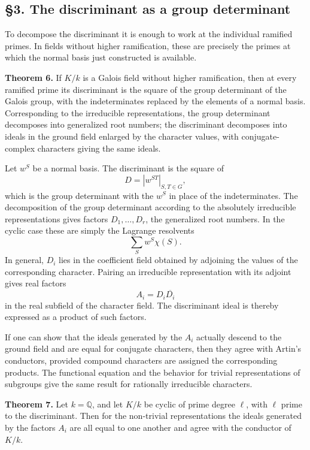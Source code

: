 \documentclass[11pt]{article}
\begin{document}
\subsection{§3. The discriminant as a group
determinant}\label{the-discriminant-as-a-group-determinant}

To decompose the discriminant it is enough to work at the individual
ramified primes. In fields without higher ramification, these are
precisely the primes at which the normal basis just constructed is
available.

\textbf{Theorem 6.} If \(K/k\) is a Galois field without higher
ramification, then at every ramified prime its discriminant is the
square of the group determinant of the Galois group, with the
indeterminates replaced by the elements of a normal basis. Corresponding
to the irreducible representations, the group determinant decomposes
into generalized root numbers; the discriminant decomposes into ideals
in the ground field enlarged by the character values, with
conjugate-complex characters giving the same ideals.

Let \(w^S\) be a normal basis. The discriminant is the square of \[
  D=|w^{ST}|_{S,T\in G},
\] which is the group determinant with the \(w^S\) in place of the
indeterminates. The decomposition of the group determinant according to
the absolutely irreducible representations gives factors \(D_1,
\ldots,D_r\), the generalized root numbers. In the cyclic case these are
simply the Lagrange resolvents \[
  \sum_S w^S \chi(S).
\] In general, \(D_i\) lies in the coefficient field obtained by
adjoining the values of the corresponding character. Pairing an
irreducible representation with its adjoint gives real factors \[
  A_i=D_i\overline{D_i}
\] in the real subfield of the character field. The discriminant ideal
is thereby expressed as a product of such factors.

If one can show that the ideals generated by the \(A_i\) actually
descend to the ground field and are equal for conjugate characters, then
they agree with Artin's conductors, provided compound characters are
assigned the corresponding products. The functional equation and the
behavior for trivial representations of subgroups give the same result
for rationally irreducible characters.

\textbf{Theorem 7.} Let \(k=\mathbb Q\), and let \(K/k\) be cyclic of
prime degree \(\ell\), with \(\ell\) prime to the discriminant. Then for
the non-trivial representations the ideals generated by the factors
\(A_i\) are all equal to one another and agree with the conductor of
\(K/k\).
\end{document}
